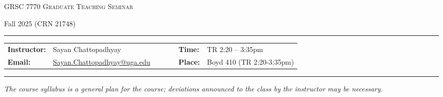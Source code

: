 \documentclass[11pt, a4paper]{article}
\begin{document}
\begin{center}
{\Large \textsc{GRSC 7770 Graduate Teaching Seminar}}
\end{center}
\begin{center}
Fall 2025 (CRN 21748)
\end{center}


\begin{center}
\rule{6in}{0.4pt}
\begin{minipage}[t]{.75\textwidth}
\begin{tabular}{llcccll}
\textbf{Instructor:} & Sayan Chattopadhyay & & &  & \textbf{Time:} & TR 2:20 -- 3:35pm \\
\textbf{Email:} &  \href{Sayan Chattopadhyay}{Sayan.Chattopadhyay@uga.edu} & & & & \textbf{Place:} & Boyd 410 (TR 2:20-3:35pm)
\end{tabular}
\end{minipage}
\rule{6in}{0.4pt}
\end{center}
\vspace{.5cm}
\setlength{\unitlength}{1in}
\renewcommand{\arraystretch}{2}

\textit{The course syllabus is a general plan for the course; deviations
announced to the class by the instructor may be necessary.}
\end{document}
